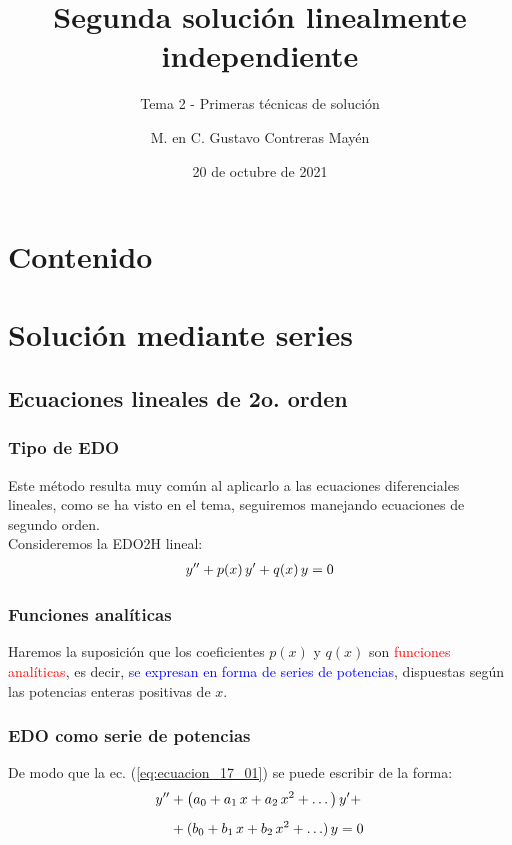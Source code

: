 \documentclass[12pt]{beamer}
\date{20 de octubre de 2021}
\title{\large{Segunda solución linealmente independiente}}
\subtitle{Tema 2 - Primeras técnicas de solución}
\author{M. en C. Gustavo Contreras Mayén}
\begin{document}
\maketitle
\fontsize{14}{14}\selectfont
{}

\section*{Contenido}

\section{Solución mediante series}
\subsection{Ecuaciones lineales de 2o. orden}

\begin{frame}
\frametitle{Tipo de EDO}
Este método resulta muy común al aplicarlo a las ecuaciones diferenciales lineales, como se ha visto en el tema, seguiremos manejando ecuaciones de segundo orden.
\\
\bigskip
\pause
Consideremos la EDO2H lineal:
\pause
\begin{align}
    {y}^{\prime \prime} + p(x) \, {y}^{\prime} + q(x) \, y = 0
    \label{eq:ecuacion_17_01}
\end{align}
\end{frame}
\begin{frame}
\frametitle{Funciones analíticas}
Haremos la suposición que los coeficientes $p(x)$ y $q(x)$ son \textcolor{red}{funciones analíticas}, \pause es decir, \textcolor{blue}{se expresan en forma de series de potencias}, dispuestas según las potencias enteras positivas de $x$.
\end{frame}
\begin{frame}
\frametitle{EDO como serie de potencias}
De modo que la ec. (\ref{eq:ecuacion_17_01}) se puede escribir de la forma:
\pause
\begin{align}
\begin{aligned}[b]
{y}^{\prime \prime} &+ \big( a_{0} + a_{1} \, x + a_{2} \, x^{2} + \ldots \big) \, {y}^{\prime} + \\[0.5em]
&+ (b_{0} + b_{1} \, x + b_{2} \, x^{2} + \ldots) \, y = 0
\end{aligned}
\label{eq:ecuacion_17_02}
\end{align}
\end{frame}
\end{document}
